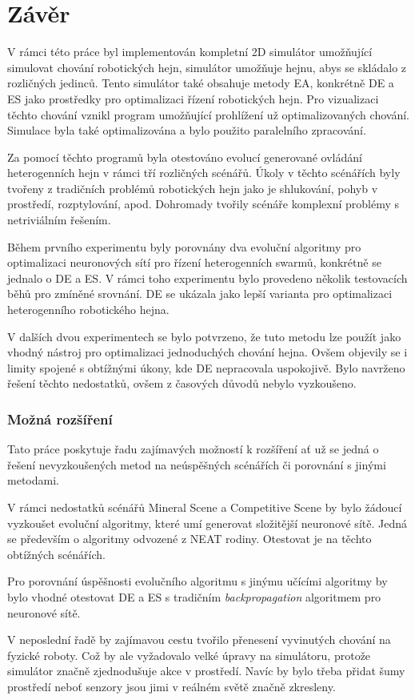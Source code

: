 \chapter*{Závěr}
V rámci této práce byl implementován kompletní 2D simulátor umožňující simulovat chování robotických hejn, simulátor umožňuje hejnu, abys se skládalo z rozličných jedinců. Tento simulátor také obsahuje metody EA, konkrétně DE a ES jako prostředky pro optimalizaci řízení robotických hejn. Pro vizualizaci těchto chování vznikl program umožňující prohlížení už optimalizovaných chování. Simulace byla také optimalizována a bylo použito paralelního zpracování. 
\par
Za pomocí těchto programů byla otestováno evolucí generované ovládání heterogenních hejn v rámci tří rozličných scénářů. Úkoly v těchto scénářích byly tvořeny z tradičních problémů robotických hejn jako je shlukování, pohyb v prostředí, rozptylování, apod. Dohromady tvořily scénáře komplexní problémy s netriviálním řešením. 
\par
Během prvního experimentu byly porovnány dva evoluční algoritmy pro optimalizaci neuronových sítí pro řízení heterogenních  swarmů, konkrétně se jednalo o DE a ES. V rámci toho experimentu bylo provedeno několik testovacích běhů pro zmíněné srovnání. DE se ukázala jako lepší varianta pro optimalizaci heterogenního robotického hejna. 
\par 
V dalších dvou experimentech se bylo potvrzeno, že tuto metodu lze použít jako vhodný nástroj pro optimalizaci jednoduchých chování hejna. Ovšem objevily se i limity spojené s obtížnými úkony, kde DE nepracovala uspokojivě. Bylo navrženo řešení těchto nedostatků, ovšem z časových důvodů nebylo vyzkoušeno. 

\subsection*{Možná rozšíření}
Tato práce poskytuje řadu zajímavých možností k rozšíření ať už se jedná o řešení nevyzkoušených metod na neúspěšných scénářích či porovnání s jinými metodami.\par
V rámci nedostatků scénářů Mineral Scene a Competitive Scene by bylo žádoucí vyzkoušet evoluční algoritmy, které umí generovat složitější neuronové sítě. Jedná se především o algoritmy odvozené z NEAT rodiny. Otestovat je na těchto obtížných scénářích.
\par
Pro porovnání úspěšnosti evolučního algoritmu s jinýmu učícími algoritmy by bylo vhodné otestovat DE a ES s tradičním \textit{backpropagation} algoritmem pro neuronové sítě. 
\par
V neposlední řadě by zajímavou cestu tvořilo přenesení vyvinutých chování na fyzické roboty. Což by ale vyžadovalo velké úpravy na simulátoru, protože simulátor značně zjednodušuje akce v prostředí. Navíc by bylo třeba přidat šumy prostředí neboť senzory jsou jimi v reálném světě značně zkresleny. 